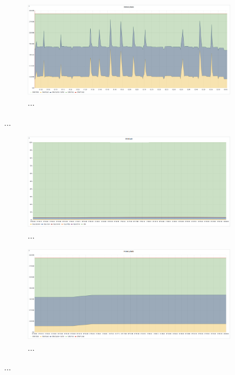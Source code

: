 \begin{figure}[H]
\begin{subfigure}[h]{0.5\linewidth}
        \centering
        \includegraphics[width=1\linewidth]{other-fig/tests/burst_ram1.png}
        \caption{...}
    \end{subfigure}
    \caption{...}
\end{figure}

\begin{figure}[H]
    \begin{subfigure}[h]{0.5\linewidth}
        \centering
        \includegraphics[width=1\linewidth]{other-fig/tests/burst_cached_cpu.png}
        \caption{...}
    \end{subfigure}
    \hfill
    \begin{subfigure}[h]{0.5\linewidth}
        \centering
        \includegraphics[width=1\linewidth]{other-fig/tests/burst_cached_ram.png}
        \caption{...}
    \end{subfigure}
    \caption{...}
\end{figure}

